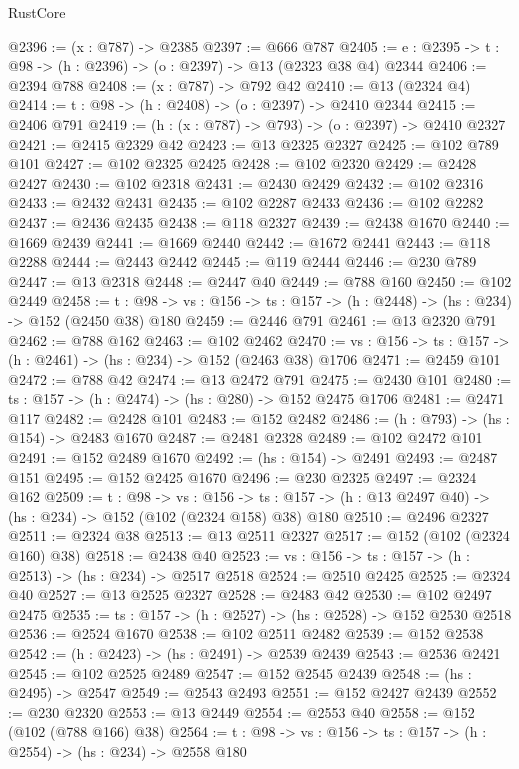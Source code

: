 \begin{lexlean}{RustCore}
\begin{coremodule}
@2396 := (x : @787) -> @2385
@2397 := @666 @787
@2405 := {e : @2395} -> {t : @98} -> (h : @2396) -> (o : @2397) -> @13 (@2323 @38 @4) @2344
@2406 := @2394 @788
@2408 := (x : @787) -> @792 @42
@2410 := @13 (@2324 @4)
@2414 := {t : @98} -> (h : @2408) -> (o : @2397) -> @2410 @2344
@2415 := @2406 @791
@2419 := (h : (x : @787) -> @793) -> (o : @2397) -> @2410 @2327
@2421 := @2415 @2329 @42
@2423 := @13 @2325 @2327
@2425 := @102 @789 @101
@2427 := @102 @2325 @2425
@2428 := @102 @2320
@2429 := @2428 @2427
@2430 := @102 @2318
@2431 := @2430 @2429
@2432 := @102 @2316
@2433 := @2432 @2431
@2435 := @102 @2287 @2433
@2436 := @102 @2282
@2437 := @2436 @2435
@2438 := @118 @2327
@2439 := @2438 @1670
@2440 := @1669 @2439
@2441 := @1669 @2440
@2442 := @1672 @2441
@2443 := @118 @2288
@2444 := @2443 @2442
@2445 := @119 @2444
@2446 := @230 @789
@2447 := @13 @2318
@2448 := @2447 @40
@2449 := @788 @160
@2450 := @102 @2449
@2458 := {t : @98} ->
  {vs : @156} -> {ts : @157} -> (h : @2448) -> (hs : @234) -> @152 (@2450 @38) @180
@2459 := @2446 @791
@2461 := @13 @2320 @791
@2462 := @788 @162
@2463 := @102 @2462
@2470 := {vs : @156} -> {ts : @157} -> (h : @2461) -> (hs : @234) -> @152 (@2463 @38) @1706
@2471 := @2459 @101
@2472 := @788 @42
@2474 := @13 @2472 @791
@2475 := @2430 @101
@2480 := {ts : @157} -> (h : @2474) -> (hs : @280) -> @152 @2475 @1706
@2481 := @2471 @117
@2482 := @2428 @101
@2483 := @152 @2482
@2486 := (h : @793) -> (hs : @154) -> @2483 @1670
@2487 := @2481 @2328
@2489 := @102 @2472 @101
@2491 := @152 @2489 @1670
@2492 := (hs : @154) -> @2491
@2493 := @2487 @151
@2495 := @152 @2425 @1670
@2496 := @230 @2325
@2497 := @2324 @162
@2509 := {t : @98} ->
  {vs : @156} ->
  {ts : @157} -> (h : @13 @2497 @40) -> (hs : @234) -> @152 (@102 (@2324 @158) @38) @180
@2510 := @2496 @2327
@2511 := @2324 @38
@2513 := @13 @2511 @2327
@2517 := @152 (@102 (@2324 @160) @38)
@2518 := @2438 @40
@2523 := {vs : @156} -> {ts : @157} -> (h : @2513) -> (hs : @234) -> @2517 @2518
@2524 := @2510 @2425
@2525 := @2324 @40
@2527 := @13 @2525 @2327
@2528 := @2483 @42
@2530 := @102 @2497 @2475
@2535 := {ts : @157} -> (h : @2527) -> (hs : @2528) -> @152 @2530 @2518
@2536 := @2524 @1670
@2538 := @102 @2511 @2482
@2539 := @152 @2538
@2542 := (h : @2423) -> (hs : @2491) -> @2539 @2439
@2543 := @2536 @2421
@2545 := @102 @2525 @2489
@2547 := @152 @2545 @2439
@2548 := (hs : @2495) -> @2547
@2549 := @2543 @2493
@2551 := @152 @2427 @2439
@2552 := @230 @2320
@2553 := @13 @2449
@2554 := @2553 @40
@2558 := @152 (@102 (@788 @166) @38)
@2564 := {t : @98} -> {vs : @156} -> {ts : @157} -> (h : @2554) -> (hs : @234) -> @2558 @180

\end{coremodule}
\end{lexlean}
